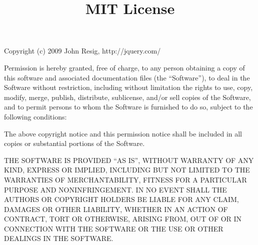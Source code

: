 \documentclass[a4paper, 12pt]{article}
\begin{document}
\title{MIT License}
\date{}

\maketitle
Copyright (c) 2009 John Resig, http://jquery.com/

\vspace{0.5cm}

Permission is hereby granted, free of charge, to any person obtaining a copy of this software and associated documentation files (the ``Software''), to deal in the Software without restriction, including without limitation the rights to use, copy, modify, merge, publish, distribute, sublicense, and/or sell copies of the Software, and to permit persons to whom the Software is furnished to do so, subject to the following conditions:

\vspace{0.3cm}

The above copyright notice and this permission notice shall be included in all copies or substantial portions of the Software.

\vspace{0.5cm}

THE SOFTWARE IS PROVIDED ``AS IS'', WITHOUT WARRANTY OF ANY KIND, EXPRESS OR IMPLIED, INCLUDING BUT NOT LIMITED TO THE WARRANTIES OF MERCHANTABILITY, FITNESS FOR A PARTICULAR PURPOSE AND NONINFRINGEMENT. IN NO EVENT SHALL THE AUTHORS OR COPYRIGHT HOLDERS BE LIABLE FOR ANY CLAIM, DAMAGES OR OTHER LIABILITY, WHETHER IN AN ACTION OF CONTRACT, TORT OR OTHERWISE, ARISING FROM, OUT OF OR IN CONNECTION WITH THE SOFTWARE OR THE USE OR OTHER DEALINGS IN THE SOFTWARE.
\end{document}

